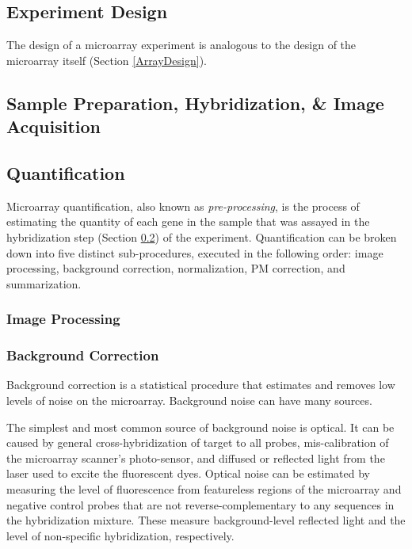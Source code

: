 \subsection{Experiment Design}
\label{ExperimentDesign}

The design of a microarray experiment is analogous to the design of the
microarray itself (Section \ref{ArrayDesign}).


\subsection{Sample Preparation, Hybridization, \& Image Acquisition}
\label{Hybridization}

\subsection{Quantification}
\label{Quantification}

Microarray quantification, also known as \emph{pre-processing}, is the
process of estimating the quantity of each gene in the sample that was assayed
in the hybridization step (Section \ref{Hybridization}) of the experiment.
Quantification can be broken down into five distinct sub-procedures, executed
in the following order: image processing, background correction, normalization,
PM correction, and summarization.

\subsubsection{Image Processing}
\label{Image Processing}

\subsubsection{Background Correction}
\label{Background Correction}

Background correction is a statistical procedure that estimates and removes low
levels of noise on the microarray.  Background noise can have many sources.

The simplest and most common source of background noise is optical.  It can be
caused by general cross-hybridization of target to all probes, mis-calibration
of the microarray scanner's photo-sensor, and diffused or reflected light from
the laser used to excite the fluorescent dyes.  Optical noise can be estimated
by measuring the level of fluorescence from featureless regions of the
microarray and negative control probes that are not reverse-complementary to
any sequences in the hybridization mixture.  These measure background-level
reflected light and the level of non-specific hybridization, respectively.

